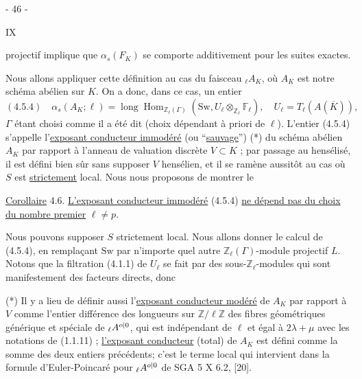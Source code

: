 \begin{center}- 46 -\end{center}\hfill IX

projectif implique que $\alpha_s(F_K)$ se comporte additivement pour les suites exactes.

Nous allons appliquer cette définition au cas du faisceau ${}_\ell A_K$, où $A_K$ est notre schéma abélien sur $K$. On a donc, dans ce cas, un entier
\[
 (4.5.4)\quad\alpha_s(A_K;\ell)=\operatorname{long}\operatorname{Hom}_{\mathbb Z_\ell(\Gamma)}(\mathrm{Sw},U_\ell\otimes_{\mathbb Z_\ell}\mathbb F_\ell),\quad U_\ell=T_\ell(A(\overline K)),
\]
$\Gamma$ étant choisi comme il a été dit (choix dépendant à priori de $\ell$).
L'entier (4.5.4) s'appelle l'\uline{exposant conducteur immodéré} (ou ``\uline{sauvage}'') (*) du schéma abélien $A_K$ par rapport à l'anneau de valuation discrète $V\subset K$ ; par passage au hensélisé, il est défini bien sûr sans supposer $V$ hensélien, et il se ramène aussitôt au cas où $S$ est \uline{strictement} local. Nous nous proposons de montrer le

\uline{Corollaire} 4.6. \uline{L'exposant conducteur immodéré} (4.5.4) \uline{ne dépend pas du choix du nombre premier} $\ell\ne p$.

Nous pouvons supposer $S$ strictement local. Nous allons donner le calcul de (4.5.4), en remplaçant $\mathrm{Sw}$ par n'importe quel autre $\mathbb Z_\ell(\Gamma)$-module projectif $L$. Notons que la filtration (4.1.1) de $U_\ell$ se fait par des sous-$\mathbb Z_\ell$-modules qui sont manifestement des facteurs directs, donc

(*) Il y a lieu de définir aussi l'\uline{exposant conducteur modéré} de $A_K$ par rapport à $V$ comme l'entier différence des longueurs sur $\mathbb Z/\ell\mathbb Z$ des fibres géométriques générique et spéciale de ${}_\ell A^{{o|0}}$, qui est indépendant de $\ell$ et égal à $2\lambda+\mu$ avec les notations de (1.1.11) ; \uline{l'exposant conducteur} (total) de $A_K$ est défini comme la somme des deux entiers précédents; c'est le terme local qui intervient dans la formule d'Euler-Poincaré pour ${}_\ell A^{{o|0}}$ de SGA 5 X 6.2, [20].
